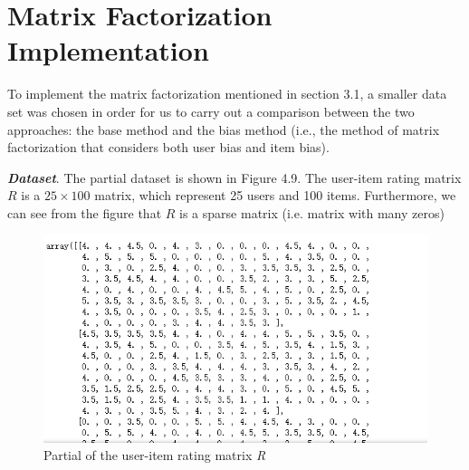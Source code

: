 \section{Matrix Factorization Implementation}
To implement the matrix factorization mentioned in section 3.1, a smaller data set was chosen in order for us to carry out a comparison between the two approaches: the base method and the bias method (i.e., the method of matrix factorization that considers both user bias and item bias). 

\textbf{\textit{Dataset}}. The partial dataset is shown in Figure 4.9. The user-item rating matrix $\textit{R}$ is a $25 \times 100$ matrix, which represent 25 users and 100 items. Furthermore, we can see from the figure that  $\textit{R}$ is a sparse matrix (i.e. matrix with many zeros)
\begin{figure}
\centering
\includegraphics[scale =0.8]{figure/mf1.png}
\caption{Partial  of the user-item rating matrix \textit{R}}
\end{figure}

